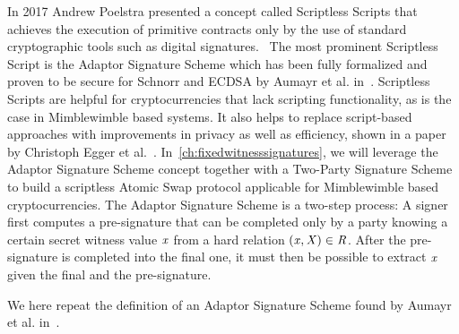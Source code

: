 In 2017 Andrew Poelstra presented a concept called Scriptless Scripts that achieves the execution of primitive contracts only by the use of standard cryptographic tools such as digital signatures.~\cite{poelstra2017scriptless}
The most prominent Scriptless Script is the Adaptor Signature Scheme which has been fully formalized and proven to be secure for Schnorr and ECDSA by Aumayr et al. in~\cite{aumayr2020bitcoinchannels}.
Scriptless Scripts are helpful for cryptocurrencies that lack scripting functionality, as is the case in Mimblewimble based systems.
It also helps to replace script-based approaches with improvements in privacy as well as efficiency, shown in a paper by Christoph Egger et al.~\cite{egger2019atomic}.
In~\cref{ch:fixedwitnesssignatures}, we will leverage the Adaptor Signature Scheme concept together with a Two-Party Signature Scheme to build a scriptless Atomic Swap protocol applicable for Mimblewimble based cryptocurrencies.
The Adaptor Signature Scheme is a two-step process:
A signer first computes a pre-signature that can be completed only by a party knowing a certain secret witness value $\mathit{x}$ from a hard relation $(\mathit{x}, \mathit{X}) \in \mathit{R}$.
After the pre-signature is completed into the final one, it must then be possible to extract $\mathit{x}$ given the final and the pre-signature.

We here repeat the definition of an Adaptor Signature Scheme found by Aumayr et al. in~\cite{aumayr2020bitcoinchannels}.

